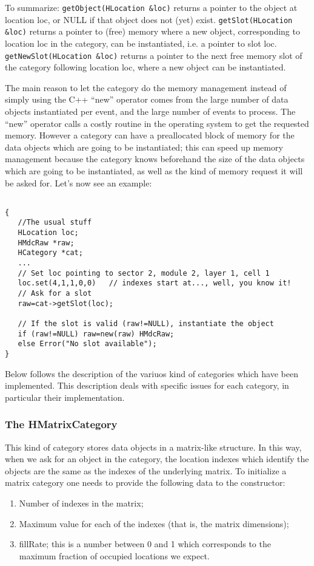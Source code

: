 To summarize:
\verb+getObject(HLocation &loc)+ returns a pointer to the object at 
location loc, or NULL if that object does not (yet) exist.
\verb+getSlot(HLocation &loc)+ returns a pointer to (free) memory 
where a new object, corresponding to location loc in the category, 
can be instantiated, i.e. a pointer to slot loc.
\verb+getNewSlot(HLocation &loc)+ returns a pointer to the next free 
memory slot of the category following location loc, where a new object 
can be instantiated.

The main reason to let the category do the memory management instead of 
simply using the C++ ``new'' operator comes from the large number of 
data objects instantiated per event, and the large number of events 
to process. The ``new'' operator calls a costly routine in the operating 
system to get the requested memory. However a category can have a 
preallocated block of memory for the data objects which are going to be 
instantiated; this can speed up memory management because the category 
knows beforehand the size of the data objects which are going to be 
instantiated, as well as the kind of memory request it will be asked 
for. Let's now see an example:

\begin{lstlisting}

{
   //The usual stuff
   HLocation loc;
   HMdcRaw *raw;
   HCategory *cat;
   ...
   // Set loc pointing to sector 2, module 2, layer 1, cell 1
   loc.set(4,1,1,0,0)   // indexes start at..., well, you know it!
   // Ask for a slot
   raw=cat->getSlot(loc);

   // If the slot is valid (raw!=NULL), instantiate the object
   if (raw!=NULL) raw=new(raw) HMdcRaw;
   else Error("No slot available");
}
\end{lstlisting}

Below follows the description of the variuos kind of categories which 
have been implemented. This description deals with specific issues for 
each category, in particular their implementation.

\subsubsection{The HMatrixCategory}

This kind of category stores data objects in a matrix-like structure. 
In this way, when we ask for an object in the category, the location 
indexes which identify the objects are the same as the indexes of the 
underlying matrix. To initialize a matrix category one needs to provide 
the following data to the constructor:
\begin{enumerate}
    \item Number of indexes in the matrix;
    \item Maximum value for each of the indexes (that is, the matrix dimensions);
    \item fillRate; this is a number between 0 and 1 which corresponds to the maximum fraction of occupied locations we expect. 
\end{enumerate}

